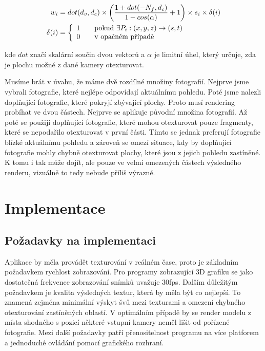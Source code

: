 \documentclass[11pt,twoside,a4paper]{book}
\begin{document}
\begin{align}
\label{eq:weight-scheme}
w_i &= dot(d_v, d_c) \times \left(\frac{1 + dot(-N_f, d_c)}{1 - cos(\alpha)} + 1\right) \times s_i \times \delta(i)\\
\delta(i) &= \left\{
  \begin{array}{l l}
    1 & \quad \text{pokud~$\exists P_i:(x, y, z) \to (s, t)$}\\
    0 & \quad \text{v opačném případě}
  \end{array} \right.
\end{align}

\noindent kde $dot$ značí skalární součin dvou vektorů a $\alpha$ je limitní úhel, který určuje, zda je plochu možné z dané kamery otexturovat.

Musíme brát v úvahu, že máme dvě rozdílné množiny fotografií. Nejprve jsme vybrali fotografie, které nejlépe odpovídají aktuálnímu pohledu. Poté jsme nalezli doplňující fotografie, které pokryjí zbývající plochy. Proto musí rendering probíhat ve dvou částech. Nejprve se aplikuje původní množina fotografií. Až poté se použijí doplňující fotografie, které mohou otexturovat pouze fragmenty, které se nepodařilo otexturovat v první části. Tímto se jednak preferují fotografie blízké aktuálnímu pohledu a zároveň se omezí situace, kdy by doplňující fotografie mohly chybně otexturovat plochy, které jsou z jejich pohledu zastíněné. K tomu i tak může dojít, ale pouze ve velmi omezených částech výsledného renderu, vizuálně to tedy nebude příliš výrazné. 


\chapter{Implementace}
\label{chap:impl}
\section{Požadavky na implementaci}

Aplikace by měla provádět texturování v reálném čase, proto je základním požadavkem rychlost zobrazování. Pro programy zobrazující 3D grafiku se jako dostatečná frekvence zobrazování snímků uvažuje 30fps. Dalším důležitým požadavkem je kvalita výsledných textur, která by měla být co nejlepší. To znamená zejména minimální výskyt švů mezi texturami a omezení chybného otexturování zastíněných oblastí. V optimálním případě by se render modelu z místa shodného s pozicí některé vstupní kamery neměl lišit od pořízené fotografie. Mezi další požadavky patří přenositelnost programu na více platforem a jednoduché ovládání pomocí grafického rozhraní.
\end{document}
